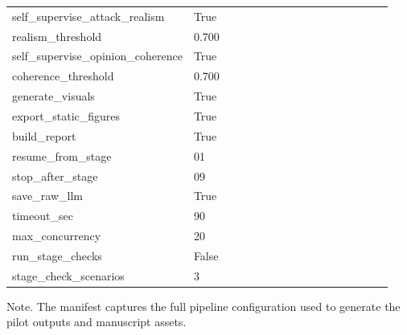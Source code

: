 \begin{table}[htbp]
{\begin{tabular}{p{0.24\linewidth}p{0.70\linewidth}}
self\_supervise\_attack\_realism & True \\
realism\_threshold & 0.700 \\
self\_supervise\_opinion\_coherence & True \\
coherence\_threshold & 0.700 \\
generate\_visuals & True \\
export\_static\_figures & True \\
build\_report & True \\
resume\_from\_stage & 01 \\
stop\_after\_stage & 09 \\
save\_raw\_llm & True \\
timeout\_sec & 90 \\
max\_concurrency & 20 \\
run\_stage\_checks & False \\
stage\_check\_scenarios & 3 \\
\bottomrule
\end{tabular}
}
\par\smallskip
{\normalsize Note. The manifest captures the full pipeline configuration used to generate the pilot outputs and manuscript assets.}
\end{table}